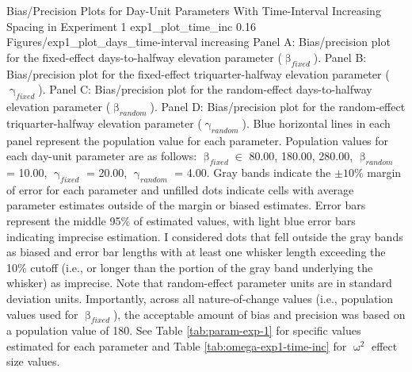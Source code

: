 \documentclass[
12pt, %
twoside,
english]{guelphthesis}
\begin{document}
\begin{apaFigure}
[portrait] %
[samepage] 
[-0.2cm] %
{Bias/Precision Plots for Day-Unit Parameters With Time-Interval Increasing Spacing in Experiment 1} %
{exp1_plot_time_inc} %
{0.16} %
{Figures/exp1_plot_days_time-interval increasing} %
{Panel A: Bias/precision plot for the fixed-effect days-to-halfway elevation parameter ($\upbeta_{fixed}$). Panel B: Bias/precision plot for the fixed-effect triquarter-halfway elevation parameter ($\upgamma_{fixed}$). Panel C: Bias/precision plot for the random-effect days-to-halfway elevation parameter ($\upbeta_{random}$). Panel D: Bias/precision plot for the random-effect triquarter-halfway elevation parameter ($\upgamma_{random}$). Blue horizontal lines in each panel represent the population value for each parameter. Population values for each day-unit parameter are as follows: $\upbeta_{fixed} \in$ {80.00, 180.00, 280.00}, $\upbeta_{random}$ = 10.00, $\upgamma_{fixed}$ = 20.00, $\upgamma_{random}$ = 4.00. Gray bands indicate the $\pm 10\%$ margin of error for each parameter and unfilled dots indicate cells with average parameter estimates outside of the margin or biased estimates. Error bars represent the middle 95\% of estimated values, with light blue error bars indicating imprecise estimation. I considered dots that fell outside the gray bands as biased and error bar lengths with at least one whisker length exceeding the 10\% cutoff (i.e., or longer than the portion of the gray band underlying the whisker) as imprecise. Note that random-effect parameter units are in standard deviation units. Importantly, across all nature-of-change values (i.e., population values used for $\upbeta_{fixed}$), the acceptable amount of bias and precision was based on a population value of 180. See Table \ref{tab:param-exp-1} for specific values estimated for each parameter and Table \ref{tab:omega-exp1-time-inc} for $\upomega^2$ effect size values.}
\end{apaFigure}
\end{document}
